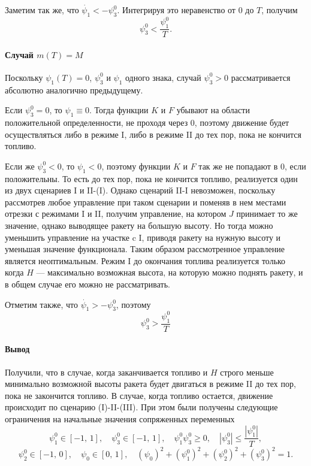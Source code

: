 \documentclass[16pt]{article}
\begin{document}
Заметим так же, что $\dot{\psi_1} < -\psi_3^0$. Интегрируя это неравенство от 0 до $T$, получим
$$\psi_3^0 < \dfrac{\psi_1^0}{T}.$$
 
\paragraph{Случай $m(T) = M$}
Поскольку $\psi_1(T) = 0$, $\psi_3^0$ и $\psi_1$ одного знака, случай $\psi_3^0 > 0$ рассматривается абсолютно
аналогично предыдущему.

Если $\psi_3^0 = 0$, то $\psi_1 \equiv 0$. Тогда функции $K$ и $F$ убывают на области положительной определенности, не
проходя через 0, поэтому движение будет осуществляться либо в режиме I, либо в режиме II до тех пор, пока не 
кончится топливо.

Если же $\psi_3^0 < 0$, то $\psi_1 < 0$, поэтому функции $K$ и $F$ так же не попадают в 0, если положительны. То 
есть до тех пор, пока не кончится топливо, реализуется один из двух сценариев I и II-(I). Однако сценарий II-I невозможен, поскольку рассмотрев любое
управление при таком сценарии и поменяв в нем местами отрезки с режимами I и II, получим управление, на котором $J$ принимает то же значение, однако выводящее ракету на большую высоту. Но тогда можно уменьшить управление на участке c I, приводя ракету на нужную высоту и уменьшая значение функционала. Таким образом рассмотренное управление является неоптимальным. Режим I до окончания топлива реализуется только когда $H$ --- максимально возможная высота, на которую
можно поднять ракету, и в общем случае его можно не рассматривать.

Отметим также, что $\dot{\psi_1} > -\psi_3^0$, поэтому 
$$\psi_3^0 > \dfrac{\psi_1^0}{T}$$

\paragraph{Вывод} Получили, что в случае, когда заканчивается топливо и $H$ строго меньше минимально возможной высоты
ракета будет двигаться в режиме II до тех пор, пока не закончится топливо. В случае, когда топливо остается, движение происходит по сценарию (I)-II-(III). При этом были получены следующие ограничения на
начальные значения сопряженных переменных
\begin{equation} \label{restr}
\psi_1^0 \in [-1,\, 1], \quad \psi_3^0 \in [-1,\,1],\quad \psi_1^0\psi_3^0 \geqslant 0, 
\quad |\psi_3^0| \leqslant \dfrac{|\psi_1^0|}{T},
\end{equation}
$$\psi_2^0 \in [-1,\, 0], \quad \psi_0 \in [0,\,1], \quad(\psi_0)^2 + (\psi_1^0)^2 + (\psi_2^0)^2 + (\psi_3^0)^2=1.$$
\end{document}

